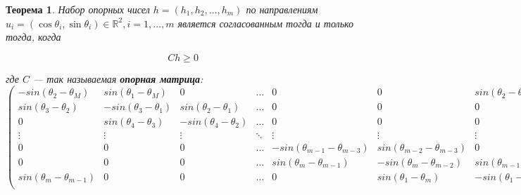 \documentclass[a4paper, 10pt]{article}
\theoremstyle{definition}
\theoremstyle{plain}
\newtheorem{SmartTheorem}{Теорема}
\theoremstyle{plain}
\begin{document}
\begin{SmartTheorem}
 \label{theorem:support-theorem}
  Набор опорных чисел $h = (h_{1}, h_{2}, \ldots, h_{m})$ по направлениям
  $u_{i} = (\cos \theta_{i}, \sin \theta_{i}) \in \mathbb{R}^{2},
  i = 1, \ldots, m$ является согласованным тогда и только тогда, когда

  \begin{equation}
   C h \geq 0
  \end{equation}

  где $C$ --- так называемая \textbf{опорная матрица}:
 \begin{equation}
  \left(
  \begin{array}{ccccccc}

   \scriptstyle     -sin(\theta_{2} - \theta_{M}) &
   \scriptstyle     sin(\theta_{1} - \theta_{M}) &
   \scriptstyle     0 &
   \scriptstyle     \ldots &
   \scriptstyle     0 &
   \scriptstyle     0 &
   \scriptstyle     sin(\theta_{2} - \theta_{1}) \\

   \scriptstyle      sin(\theta_{3} - \theta_{2}) &
   \scriptstyle      -sin(\theta_{3} - \theta_{1}) &
   \scriptstyle      sin(\theta_{2} - \theta_{1}) &
   \scriptstyle      \ldots &
   \scriptstyle      0 &
   \scriptstyle      0 &
   \scriptstyle      0 \\

   \scriptstyle      0 &
   \scriptstyle      sin(\theta_{4} - \theta_{3}) &
   \scriptstyle      -sin(\theta_{4} - \theta_{2}) &
   \scriptstyle      \ldots &
   \scriptstyle      0 &
   \scriptstyle      0 &
   \scriptstyle      0 \\

   \scriptstyle      \vdots &
   \scriptstyle      \vdots &
   \scriptstyle      \vdots &
   \scriptstyle      \ddots &
   \scriptstyle      \vdots &
   \scriptstyle      \vdots &
   \scriptstyle      \vdots \\

   \scriptstyle      0 &
   \scriptstyle      0 &
   \scriptstyle      0 &
   \scriptstyle      \ldots &
   \scriptstyle      -sin(\theta_{m - 1} - \theta_{m - 3}) &
   \scriptstyle      sin(\theta_{m - 2} - \theta_{m - 3}) &
   \scriptstyle      0 \\

   \scriptstyle      0 &
   \scriptstyle      0 &
   \scriptstyle      0 &
   \scriptstyle      \ldots &
   \scriptstyle      sin(\theta_{m} - \theta_{m - 1}) &
   \scriptstyle      -sin(\theta_{m} - \theta_{m - 2}) &
   \scriptstyle      sin(\theta_{m - 1} - \theta_{m - 2}) \\

   \scriptstyle      sin(\theta_{m} - \theta_{m - 1}) &
   \scriptstyle      0 &
   \scriptstyle      0 &
   \scriptstyle      \ldots &
   \scriptstyle      0 &
   \scriptstyle      sin(\theta_{1} - \theta_{m}) &
   \scriptstyle      -sin(\theta_{1} - \theta_{m - 1}) \\
  \end{array}
  \right)
 \end{equation}

\end{SmartTheorem}
\end{document}
